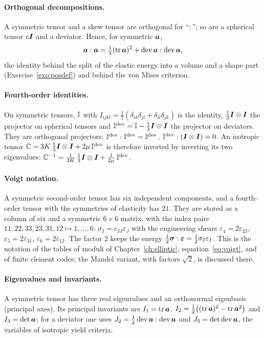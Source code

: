 \paragraph{Orthogonal decompositions.} A symmetric tensor and a skew tensor
are orthogonal for ``$:$''; so are a spherical tensor $c\bm{I}$ and a deviator.
Hence, for symmetric $\bm{a}$,
\[
  \bm{a}:\bm{a}=\tfrac13(\operatorname{tr}\bm{a})^2+\operatorname{dev}\bm{a}:\operatorname{dev}\bm{a},
\]
the identity behind the split of the elastic energy into a volume and a
shape part (Exercise~\ref{exo:posdef}) and behind the von Mises criterion.

\paragraph{Fourth-order identities.}
%
On symmetric tensors, $\mathbb{I}$ with
$I_{ijkl}=\tfrac12(\delta_{ik}\delta_{jl}+\delta_{il}\delta_{jk})$ is the identity,
$\tfrac13\bm{I}\otimes\bm{I}$ the projector on spherical tensors and
$\mathbb{I}^{\mathrm{dev}}=\mathbb{I}-\tfrac13\bm{I}\otimes\bm{I}$ the projector on deviators. They are
orthogonal projectors: $\mathbb{I}^{\mathrm{dev}}:\mathbb{I}^{\mathrm{dev}}=\mathbb{I}^{\mathrm{dev}}$, $\mathbb{I}^{\mathrm{dev}}:(\bm{I}\otimes\bm{I})=0$.
An isotropic tensor $\mathbb{C}=3K\,\tfrac13\bm{I}\otimes\bm{I}+2\mu\,\mathbb{I}^{\mathrm{dev}}$ is therefore
inverted by inverting its two eigenvalues: $\mathbb{C}^{-1}=\frac{1}{3K}\,\tfrac13\bm{I}\otimes\bm{I}+\frac{1}{2\mu}\,\mathbb{I}^{\mathrm{dev}}$.

\paragraph{Voigt notation.}
%
A symmetric second-order tensor has six independent components, and a
fourth-order tensor with the symmetries of elasticity has $21$. They are
stored as a column of six and a symmetric $6\times6$ matrix, with the index
pairs $11,22,33,23,31,12\mapsto1,\dots,6$: $\sigma_I=c_{IJ}\varepsilon_J$ with
the engineering shears $\varepsilon_4=2\varepsilon_{23}$, $\varepsilon_5=2\varepsilon_{31}$,
$\varepsilon_6=2\varepsilon_{12}$. The factor $2$ keeps the energy
$\tfrac12\bm{\sigma}:\bm{\varepsilon}=\tfrac12\sigma_I\varepsilon_I$. This is the notation of the
tables of moduli of Chapter~\ref{ch:elliptic}, equation~\eqref{eq:voigt}, and of
finite element codes; the Mandel variant, with factors $\sqrt2$, is discussed there.

\paragraph{Eigenvalues and invariants.} A symmetric tensor has three real
eigenvalues and an orthonormal eigenbasis (principal axes). Its principal
invariants are $I_1=\operatorname{tr}\bm{a}$, $I_2=\tfrac12\bigl((\operatorname{tr}\bm{a})^2-\operatorname{tr}\bm{a}^2\bigr)$
and $I_3=\det\bm{a}$; for a deviator one uses $J_2=\tfrac12\operatorname{dev}\bm{a}:\operatorname{dev}\bm{a}$
and $J_3=\det\operatorname{dev}\bm{a}$, the variables of isotropic yield criteria.

